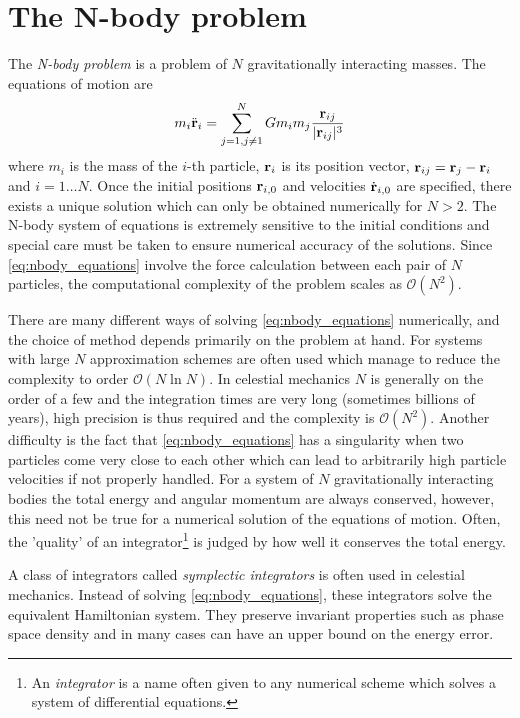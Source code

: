 \documentclass[twoside,openright,titlepage,numbers=noenddot,headinclude,%
                footinclude=true,cleardoublepage=empty,abstractoff, 
                BCOR=5mm,paper=a4,fontsize=11pt,%
                american,%
                ]{scrreprt}%
\begin{document}
\section{The N-body problem}
\label{sec:The N-body problem}
The \emph{N-body problem} is a problem of $N$ gravitationally interacting
masses. The equations of motion are
\begin{equation}
    m_i\ddot{\boldsymbol{\mathbf{r}}}_i=\sum_{j=1,j\neq 1}^NGm_im_j \frac{\boldsymbol{\mathbf{r}}_{ij}}
    {\lvert \boldsymbol{\mathbf{r}}_{ij}\rvert^3} 
    \label{eq:nbody_equations}
\end{equation}
where $m_i$ is the mass of the $i$-th particle, $\boldsymbol{\mathbf{r}}_i$ is its 
position vector, $\boldsymbol{\mathbf{r}}_{ij}=\boldsymbol{\mathbf{r}}_j-\boldsymbol{\mathbf{r}}_i$ and $i=1\dots N$.
Once the initial positions $\boldsymbol{\mathbf{r}}_{i,0}$ and velocities $\dot{\boldsymbol{\mathbf{r}}}_{i,0}$
are specified, there exists a unique solution which can only be obtained
numerically for $N>2$. The N-body system of equations is extremely sensitive
to the initial conditions and special care must be taken to ensure numerical
accuracy of the solutions. Since \cref{eq:nbody_equations} involve the force
calculation between each pair of $N$ particles, the computational complexity
of the problem scales as $\mathcal{O}(N^2)$.

There are many different ways of solving \cref{eq:nbody_equations} numerically,
and the choice of method depends primarily on the problem at hand. For systems
with large $N$
approximation schemes are often used which manage to reduce the complexity
to order $\mathcal{O}(N\ln N)$. In celestial mechanics $N$ is generally on
the order of a few and the integration times are very long (sometimes 
billions of years), high precision is thus required and the complexity is 
$\mathcal{O}(N^2)$. Another difficulty is the fact that \cref{eq:nbody_equations}
has a singularity when two particles come very close to each other which
can lead to arbitrarily high particle velocities if not properly handled.
For a system of $N$ gravitationally interacting bodies the total energy 
and angular momentum are always conserved, however, this need not be true 
for a numerical solution of the equations of motion. Often, the 'quality'
of an integrator\footnote{An \emph{integrator} is a name often given to
any numerical scheme which solves a system of differential equations.}
is judged by how well it conserves the total energy.

A class of integrators called \emph{symplectic integrators} 
\citep{vogelaere,ruth,feng} is often used
in celestial mechanics. Instead of solving \cref{eq:nbody_equations}, these
integrators solve the equivalent Hamiltonian system. They preserve
invariant properties such as phase space density and in many cases
can have an upper bound on the energy error.
\end{document}
